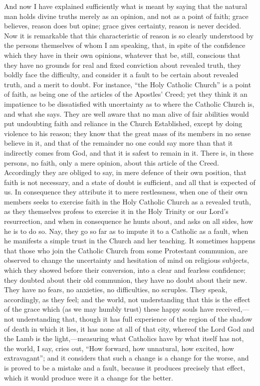 And now I have explained sufficiently what is meant by saying that
the natural man holds divine truths merely as an opinion, and not as a
point of faith; grace believes, reason does but opine; grace gives
certainty, reason is never decided. Now it is remarkable that this
characteristic of reason is so clearly understood by the persons
themselves of whom I am speaking, that, in spite of the confidence
which they have in their own opinions, whatever that be, still,
conscious that they have no grounds for real and fixed conviction
about revealed truth, they boldly face the difficulty, and consider it
a fault to be certain about revealed truth, and a merit to doubt. For
instance, ``the Holy Catholic Church'' is a point of faith, as
being one of the articles of the Apostles' Creed; yet they think it an
impatience to be dissatisfied with uncertainty as to where the
Catholic Church is, and what she says. They are well aware that no man
alive of fair abilities would put undoubting faith and reliance in the
Church Established, except by doing violence to his reason; they know
that the great mass of its members in no sense believe in it, and that
of the remainder no one could say more than that it indirectly comes
from God, and that it is safest to remain in it. There is, in these
persons, no faith, only a mere opinion, about this article of the
Creed. Accordingly they are obliged to say, in mere defence of their
own position, that faith is not necessary, and a state of doubt is
sufficient, and all that is expected of us. In consequence they
attribute it to mere restlessness, when one of their own members seeks
to exercise faith in the Holy Catholic Church as a revealed truth, as
they themselves profess to exercise it in the Holy Trinity or our
Lord's resurrection, and when in consequence he hunts about, and asks
on all sides, how he is to do so. Nay, they go so far as to impute it
to a Catholic as a fault, when he manifests a simple trust in the
Church and her teaching. It sometimes happens that those who join the
Catholic Church from some Protestant communion, are observed to change
the uncertainty and hesitation of mind on religious subjects, which
they showed before their conversion, into a clear and fearless
confidence; they doubted about their old communion, they have no doubt
about their new. They have no fears, no anxieties, no difficulties, no
scruples. They speak, accordingly, as they feel; and the world, not
understanding that this is the effect of the grace which (as we may
humbly trust) these happy souls have received,—not understanding
that, though it has full experience of the region of the shadow of
death in which it lies, it has none at all of that city, whereof the
Lord God and the Lamb is the light,—measuring what Catholics have by
what itself has not, the world, I say, cries out, ``How forward,
how unnatural, how excited, how extravagant''; and it considers
that such a change is a change for the worse, and is proved to be a
mistake and a fault, because it produces precisely that effect, which
it would produce were it a change for the better.

